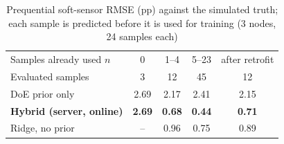 \documentclass[journal]{IEEEtran}
\begin{document}
\begin{table}[t]\centering\footnotesize
\caption{End-to-end emulation, 3 nodes $\times$ 8\,h at 2\,s (simulated plants and channel, real server software)}
\label{tab:e2e}
\setlength{\tabcolsep}{2.5pt}

\vspace{4pt}
\caption{Prequential soft-sensor RMSE (pp) against the simulated truth; each sample is predicted before it is used
for training (3 nodes, 24 samples each)}
\label{tab:preq}
\setlength{\tabcolsep}{3pt}
\begin{tabular}{lcccc}\toprule
Samples already used $n$ & 0 & 1--4 & 5--23 & after retrofit\\
Evaluated samples & 3 & 12 & 45 & 12\\\midrule
DoE prior only & 2.69 & 2.17 & 2.41 & 2.15\\
\textbf{Hybrid (server, online)} & \textbf{2.69} & \textbf{0.68} & \textbf{0.44} & \textbf{0.71}\\
Ridge, no prior & -- & 0.96 & 0.75 & 0.89\\\bottomrule
\end{tabular}
\end{table}
\end{document}
